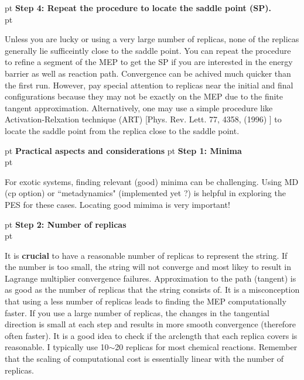 \documentclass[aps,prb,preprint,groupedaddress]{revtex4}
\begin{document}
 pt
\noindent
{\bf Step 4: Repeat the procedure to locate the saddle point (SP).  } \\
 pt
\begin{minipage}{6in}
Unless you are lucky or using a very large number of replicas, none of the replicas
generally lie sufficeintly close to the saddle point. You can repeat the procedure
to refine a segment of the MEP to get the SP if you are interested in the
energy barrier as well as reaction path. Convergence can be achived 
much quicker than the first run.
However, pay special attention to replicas
near the initial and final configurations because they 
may not be exactly on the MEP due to the finite tangent approximation.
Alternatively, one may use a simple procedure like Activation-Relxation technique (ART)  
[Phys. Rev. Lett. 77, 4358, (1996) ] to locate the saddle point from the replica
close to the saddle point. 
\end{minipage}


\newpage
{} pt
\noindent
{\Large \bf Practical aspects and considerations }
 pt
\noindent
{\bf Step 1: Minima } \\
 pt
\begin{minipage}{6in}
For exotic systems, finding relevant (good) minima can be challenging.
Using MD (cp option) or ``metadynamics" (implemented yet ?) is helpful 
in exploring the PES for these cases. Locating good mimima is very important!
\end{minipage}

 pt
\noindent
{\bf Step 2: Number of replicas } \\
 pt
\begin{minipage}{6in}
It is {\bf crucial} to have a reasonable number of replicas to represent the string.
If the number is too small, the string will not converge and most likey
to result in Lagrange multiplier convergence failures.
Approximation to the path (tangent) is as good as the number of replicas that the string consists of.
It is a misconception that using a less number of replicas
leads to finding the MEP computationally faster. If you use a large number of replicas,
the changes in the tangential direction is small at each step and results in
more smooth convergence (therefore often faster). 
It is a good idea to check if the arclength that each replica
covers is reasonable. I typically use 10$\sim$20 replicas for most chemical reactions.
Remember that the scaling of computational cost is essentially linear with the number
of replicas.
\end{minipage}
\end{document}
